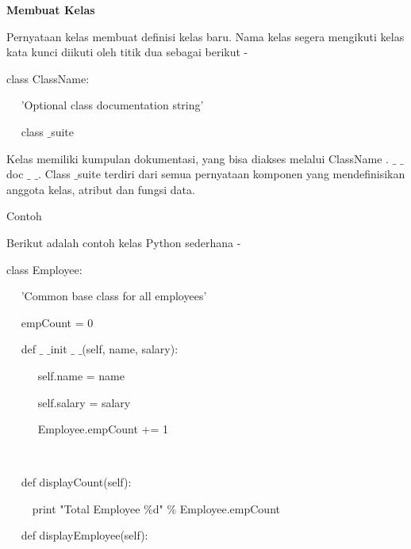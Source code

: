 \begin {enumerate}
\vspace{12pt}
\noindent 
{\fontsize{14pt}{14pt}\selectfont \textbf{Membuat Kelas} \\} \par
\vspace{12pt}
Pernyataan kelas membuat definisi kelas baru. Nama kelas segera mengikuti kelas kata kunci diikuti oleh titik dua sebagai berikut - \par
\vspace{12pt}
\vspace{12pt}
\noindent 
class ClassName: \par
\noindent 
~~ 'Optional class documentation string' \par
\noindent 
~~ class $  \_  $suite \par
\vspace{12pt}
\vspace{12pt}
Kelas memiliki kumpulan dokumentasi, yang bisa diakses melalui ClassName . $  \_  $ $  \_  $ doc $  \_  $ $  \_  $.  Class $  \_  $suite terdiri dari semua pernyataan komponen yang mendefinisikan anggota kelas, atribut dan fungsi data. \par
\vspace{12pt}
\vspace{12pt}
\noindent 
Contoh \par
\vspace{12pt}
\noindent 
Berikut adalah contoh kelas Python sederhana - \par
\vspace{12pt}
\noindent 
class Employee: \par
\noindent 
~~ 'Common base class for all employees' \par
\noindent 
~~ empCount = 0 \par
\vspace{12pt}
\noindent 
~~ def  $  \_  $ $  \_  $init $  \_  $ $  \_  $(self, name, salary): \par
\noindent 
~~~~~ self.name = name \par
\noindent 
~~~~~ self.salary = salary \par
\noindent 
~~~~~ Employee.empCount += 1 \par
\noindent 
~~  \par
\noindent 
~~ def displayCount(self): \par
\noindent 
~~~~ print "Total Employee  $  \%  $d"  $  \%  $ Employee.empCount \par
\vspace{12pt}
\noindent 
~~ def displayEmployee(self): \par

\end{enumerate}
